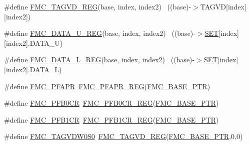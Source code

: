 \begin{DoxyCompactItemize}
\item 
\#define \hyperlink{group___f_m_c___register___accessor___macros_ga69adb2f34bbe33d04c2075cee0e7d5f4}{F\+M\+C\+\_\+\+T\+A\+G\+V\+D\+\_\+\+R\+EG}(base,  index,  index2)              ~((base)-\/$>$T\+A\+G\+VD\mbox{[}index\mbox{]}\mbox{[}index2\mbox{]})
\item 
\#define \hyperlink{group___f_m_c___register___accessor___macros_ga77e953c0a13be535a400b4fce86c0601}{F\+M\+C\+\_\+\+D\+A\+T\+A\+\_\+\+U\+\_\+\+R\+EG}(base,  index,  index2)            ~((base)-\/$>$\hyperlink{group___l_p_c___types___public___types_gga89136caac2e14c55151f527ac02daaffab44c8101cc294c074709ec1b14211792}{S\+ET}\mbox{[}index\mbox{]}\mbox{[}index2\mbox{]}.D\+A\+T\+A\+\_\+U)
\item 
\#define \hyperlink{group___f_m_c___register___accessor___macros_ga4a86395060ba1ded814dbe8cc6eb0e8c}{F\+M\+C\+\_\+\+D\+A\+T\+A\+\_\+\+L\+\_\+\+R\+EG}(base,  index,  index2)            ~((base)-\/$>$\hyperlink{group___l_p_c___types___public___types_gga89136caac2e14c55151f527ac02daaffab44c8101cc294c074709ec1b14211792}{S\+ET}\mbox{[}index\mbox{]}\mbox{[}index2\mbox{]}.D\+A\+T\+A\+\_\+L)
\item 
\#define \hyperlink{group___f_m_c___register___accessor___macros_gafb8a8e5f889afe248ded426a27574f2e}{F\+M\+C\+\_\+\+P\+F\+A\+PR}~\hyperlink{group___f_m_c___register___accessor___macros_gad43fcfd90789921daaef07d85d5da199}{F\+M\+C\+\_\+\+P\+F\+A\+P\+R\+\_\+\+R\+EG}(\hyperlink{group___f_m_c___peripheral_ga0a740437b573e32e6b932bf729485fd9}{F\+M\+C\+\_\+\+B\+A\+S\+E\+\_\+\+P\+TR})
\item 
\#define \hyperlink{group___f_m_c___register___accessor___macros_ga6db90dbda9bc68851c6e87c489f18d73}{F\+M\+C\+\_\+\+P\+F\+B0\+CR}~\hyperlink{group___f_m_c___register___accessor___macros_gabab99bf1038b07a5ffe56d7075184b65}{F\+M\+C\+\_\+\+P\+F\+B0\+C\+R\+\_\+\+R\+EG}(\hyperlink{group___f_m_c___peripheral_ga0a740437b573e32e6b932bf729485fd9}{F\+M\+C\+\_\+\+B\+A\+S\+E\+\_\+\+P\+TR})
\item 
\#define \hyperlink{group___f_m_c___register___accessor___macros_gaaa779f6efa9e2ffa004f9820c0dd2566}{F\+M\+C\+\_\+\+P\+F\+B1\+CR}~\hyperlink{group___f_m_c___register___accessor___macros_gaf6b5ee99ce57d8870974b8bc5928a19f}{F\+M\+C\+\_\+\+P\+F\+B1\+C\+R\+\_\+\+R\+EG}(\hyperlink{group___f_m_c___peripheral_ga0a740437b573e32e6b932bf729485fd9}{F\+M\+C\+\_\+\+B\+A\+S\+E\+\_\+\+P\+TR})
\item 
\#define \hyperlink{group___f_m_c___register___accessor___macros_ga08d4b90c8e72268ad41591521e7df7d7}{F\+M\+C\+\_\+\+T\+A\+G\+V\+D\+W0\+S0}~\hyperlink{group___f_m_c___register___accessor___macros_ga69adb2f34bbe33d04c2075cee0e7d5f4}{F\+M\+C\+\_\+\+T\+A\+G\+V\+D\+\_\+\+R\+EG}(\hyperlink{group___f_m_c___peripheral_ga0a740437b573e32e6b932bf729485fd9}{F\+M\+C\+\_\+\+B\+A\+S\+E\+\_\+\+P\+TR},0,0)

\end{DoxyCompactItemize}

